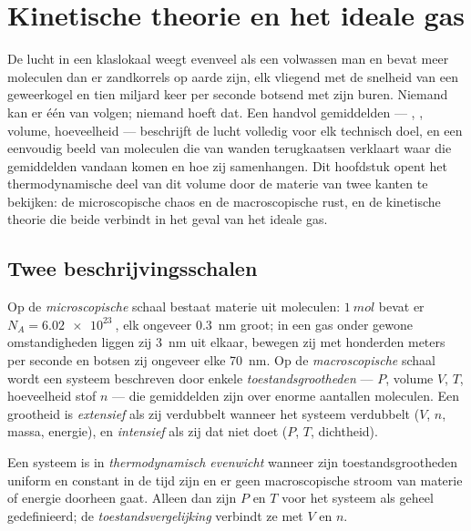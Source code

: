 \chapter{Kinetische theorie en het ideale gas}\label{ch:b1:kinetic-theory}

De lucht in een klaslokaal weegt evenveel als een volwassen man en bevat meer
moleculen dan er zandkorrels op aarde zijn, elk vliegend met de snelheid van
een geweerkogel en tien miljard keer per seconde botsend met zijn buren.
Niemand kan er één van volgen; niemand hoeft dat. Een handvol gemiddelden ---
, , volume, hoeveelheid --- beschrijft de lucht volledig voor
elk technisch doel, en een eenvoudig beeld van moleculen die van wanden
terugkaatsen verklaart waar die gemiddelden vandaan komen en hoe zij
samenhangen. Dit hoofdstuk opent het thermodynamische deel van dit volume door
de materie van twee kanten te bekijken: de microscopische chaos en de
macroscopische rust, en de kinetische theorie die beide verbindt in het geval
van het ideale gas.

\section{Twee beschrijvingsschalen}

\begin{definition}\label{def:b1:kinetic-theory:scales}
Op de \emph{microscopische} schaal bestaat materie uit moleculen: $\qty{1}{mol}$
bevat er $N_A = \qty{6.02e23}{}$, elk ongeveer \qty{0.3}{nm} groot;
in een gas onder gewone omstandigheden liggen zij \qty{3}{nm} uit elkaar, bewegen zij met
honderden meters per seconde en botsen zij ongeveer elke \qty{70}{nm}.
Op de \emph{macroscopische} schaal wordt een systeem beschreven door enkele
\emph{toestandsgrootheden} ---  $P$, volume $V$,  $T$,
hoeveelheid stof $n$ --- die gemiddelden zijn over enorme aantallen
moleculen. Een grootheid is \emph{extensief} als zij verdubbelt wanneer het systeem
verdubbelt ($V$, $n$, massa, energie), en \emph{intensief} als zij dat niet doet
($P$, $T$, dichtheid).
\end{definition}

\begin{definition}\label{def:b1:kinetic-theory:equilibrium}
Een systeem is in \emph{thermodynamisch evenwicht} wanneer zijn toestandsgrootheden
uniform en constant in de tijd zijn en er geen macroscopische stroom van materie of
energie doorheen gaat. Alleen dan zijn $P$ en $T$ voor het systeem als
geheel gedefinieerd; de \emph{toestandsvergelijking} verbindt ze met $V$ en $n$.
\end{definition}

